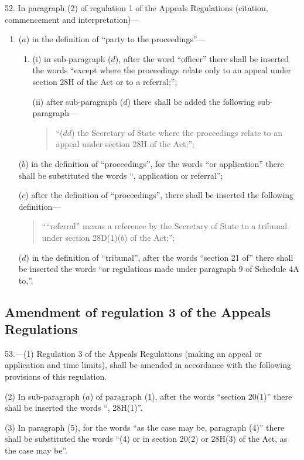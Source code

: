 \documentclass[12pt,a4paper]{article}
\begin{document}
52. In paragraph (2) of regulation 1 of the Appeals Regulations
(citation, commencement and interpretation)—
\begin{enumerate}\item[]
($a$) in the definition of “party to the proceedings”—
\begin{enumerate}\item[]
(i) in sub-paragraph ($d$), after the word “officer” there shall be inserted the
words “except where the proceedings relate only to an appeal under section 28H
of the Act or to a referral;”;

(ii) after sub-paragraph ($d$) there shall be added the following sub-paragraph—
\begin{quotation}
“($dd$) the Secretary of State where the proceedings relate to an appeal under
section 28H of the Act;”;
\end{quotation}
\end{enumerate}

($b$) in the definition of “proceedings”, for the words “or application” there
shall be substituted the words “, application or referral”;

($c$) after the definition of “proceedings”, there shall be inserted the following
definition—
\begin{quotation}
““referral” means a reference by the Secretary of State to a tribunal under
section 28D(1)($b$) of the Act;”;
\end{quotation}

($d$) in the definition of “tribunal”, after the words “section 21 of” there shall
be inserted the words “or regulations made under paragraph 9 of Schedule 4A
to,”.
\end{enumerate}

\subsection[53. Amendment of regulation 3 of the Appeals Regulations]{Amendment of regulation 3 of the Appeals Regulations}

53.—(1) Regulation 3 of the
Appeals Regulations (making an appeal or application and time limits), shall be
amended in accordance with the following provisions of this regulation.

(2) In sub-paragraph ($a$) of paragraph (1), after the words “section 20(1)” there
shall be inserted the words “, 28H(1)”.

(3) In paragraph (5), for the words “as the case may be, paragraph (4)” there
shall be substituted the words “(4) or in section 20(2) or 28H(3) of the Act, as
the case may be”.
\end{document}
